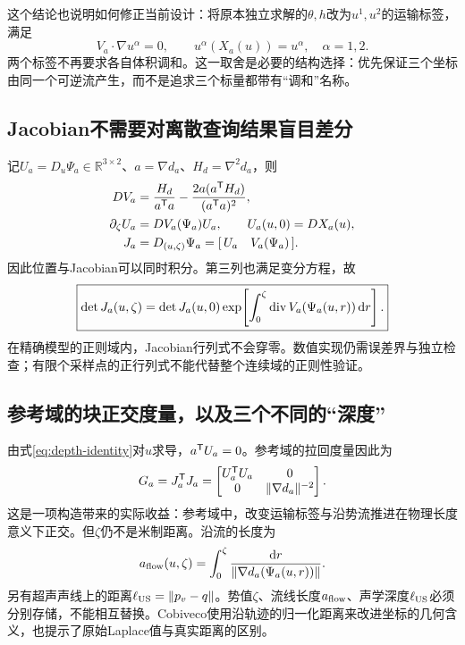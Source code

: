 \documentclass[UTF8,11pt,a4paper,fontset=fandol]{ctexart}
\numberwithin{equation}{section}
\theoremstyle{plain}
\theoremstyle{definition}
\theoremstyle{remark}
\newcommand{\R}{\mathbb R}\newcommand{\E}{\mathbb E}
\begin{document}
这个结论也说明如何修正当前设计：将原本独立求解的$\theta,h$改为$u^1,u^2$的运输标签，满足
\begin{equation}
 V_a\cdot\nabla u^\alpha=0,\qquad
 u^\alpha(X_a(u))=u^\alpha,\quad\alpha=1,2.
 \label{eq:advected-labels}
\end{equation}
两个标签不再要求各自体积调和。这一取舍是必要的结构选择：优先保证三个坐标由同一个可逆流产生，而不是追求三个标量都带有“调和”名称。

\subsection{Jacobian不需要对离散查询结果盲目差分}
记$U_a=D_u\Psi_a\in\R^{3\times2}$、$a=\nabla d_a$、$H_d=\nabla^2d_a$，则
\begin{align}
 D V_a&=\frac{H_d}{a^{\mathsf T} a}-\frac{2a(a^{\mathsf T} H_d)}{(a^{\mathsf T} a)^2},\\
 \partial_\zeta U_a&=D V_a(\Psi_a)U_a,
 \qquad U_a(u,0)=D X_a(u),\\
 J_a&=D_{(u,\zeta)}\Psi_a=[\,U_a\quad V_a(\Psi_a)\,].
 \label{eq:jac-variational}
\end{align}
因此位置与Jacobian可以同时积分。第三列也满足变分方程，故
\begin{equation}
 \boxed{
 \det J_a(u,\zeta)=\det J_a(u,0)
 \exp\!\left[\int_0^\zeta \operatorname{div} V_a(\Psi_a(u,r))\,\mathrm d r\right].
 }
 \label{eq:liouville}
\end{equation}
在精确模型的正则域内，Jacobian行列式不会穿零。数值实现仍需误差界与独立检查；有限个采样点的正行列式不能代替整个连续域的正则性验证。

\subsection{参考域的块正交度量，以及三个不同的“深度”}
由式\eqref{eq:depth-identity}对$u$求导，$a^{\mathsf T} U_a=0$。参考域的拉回度量因此为
\begin{equation}
 G_a=J_a^{\mathsf T} J_a=
 \begin{bmatrix}
 U_a^{\mathsf T} U_a&0\\
 0&\|\nabla d_a\|^{-2}
 \end{bmatrix}.
 \label{eq:reference-metric}
\end{equation}
这是一项构造带来的实际收益：参考域中，改变运输标签与沿势流推进在物理长度意义下正交。但$\zeta$仍不是米制距离。沿流的长度为
\begin{equation}
 a_{\rm flow}(u,\zeta)=\int_0^\zeta\frac{\mathrm d r}{\|\nabla d_a(\Psi_a(u,r))\|}.
 \label{eq:flow-distance}
\end{equation}
另有超声声线上的距离$\ell_{\rm US}=\|p_v-q\|$。势值$\zeta$、流线长度$a_{\rm flow}$、声学深度$\ell_{\rm US}$必须分别存储，不能相互替换。Cobiveco使用沿轨迹的归一化距离来改进坐标的几何含义，也提示了原始Laplace值与真实距离的区别\cite{Schuler2021}。
\end{document}
